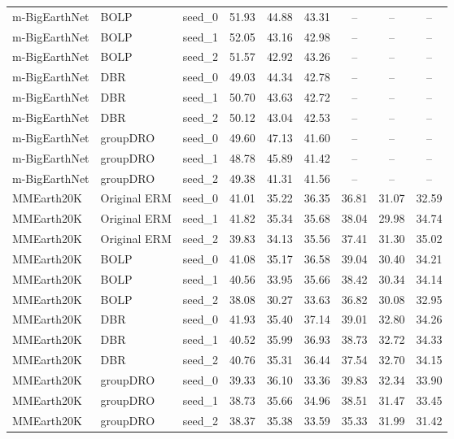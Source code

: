 \documentclass[11pt]{article}
\begin{document}
\begin{table}[h!]
{\begin{tabular}{lllcccccc}
m-BigEarthNet & BOLP & seed\_0 & 51.93 & 44.88 & 43.31 & -- & -- & -- \\
m-BigEarthNet & BOLP & seed\_1 & 52.05 & 43.16 & 42.98 & -- & -- & -- \\
m-BigEarthNet & BOLP & seed\_2 & 51.57 & 42.92 & 43.26 & -- & -- & -- \\

m-BigEarthNet & DBR & seed\_0 & 49.03 & 44.34 & 42.78 & -- & -- & -- \\
m-BigEarthNet & DBR & seed\_1 & 50.70 & 43.63 & 42.72 & -- & -- & -- \\
m-BigEarthNet & DBR & seed\_2 & 50.12 & 43.04 & 42.53 & -- & -- & -- \\

m-BigEarthNet & groupDRO & seed\_0 & 49.60 & 47.13 & 41.60 & -- & -- & -- \\
m-BigEarthNet & groupDRO & seed\_1 & 48.78 & 45.89 & 41.42 & -- & -- & -- \\
m-BigEarthNet & groupDRO & seed\_2 & 49.38 & 41.31 & 41.56 & -- & -- & -- \\

\midrule

MMEarth20K & Original ERM & seed\_0 & 41.01 & 35.22 & 36.35 & 36.81 & 31.07 & 32.59 \\
MMEarth20K & Original ERM & seed\_1 & 41.82 & 35.34 & 35.68 & 38.04 & 29.98 & 34.74 \\
MMEarth20K & Original ERM & seed\_2 & 39.83 & 34.13 & 35.56 & 37.41 & 31.30 & 35.02 \\

MMEarth20K & BOLP & seed\_0 & 41.08 & 35.17 & 36.58 & 39.04 & 30.40 & 34.21 \\
MMEarth20K & BOLP & seed\_1 & 40.56 & 33.95 & 35.66 & 38.42 & 30.34 & 34.14 \\
MMEarth20K & BOLP & seed\_2 & 38.08 & 30.27 & 33.63 & 36.82 & 30.08 & 32.95 \\

MMEarth20K & DBR & seed\_0 & 41.93 & 35.40 & 37.14 & 39.01 & 32.80 & 34.26 \\
MMEarth20K & DBR & seed\_1 & 40.52 & 35.99 & 36.93 & 38.73 & 32.72 & 34.33 \\
MMEarth20K & DBR & seed\_2 & 40.76 & 35.31 & 36.44 & 37.54 & 32.70 & 34.15 \\

MMEarth20K & groupDRO & seed\_0 & 39.33 & 36.10 & 33.36 & 39.83 & 32.34 & 33.90 \\
MMEarth20K & groupDRO & seed\_1 & 38.73 & 35.66 & 34.96 & 38.51 & 31.47 & 33.45 \\
MMEarth20K & groupDRO & seed\_2 & 38.37 & 35.38 & 33.59 & 35.33 & 31.99 & 31.42 \\


\end{tabular}}
\end{table}
\end{document}
